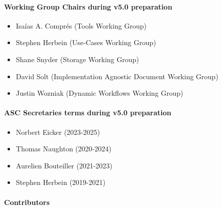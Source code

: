 \paragraph*{Working Group Chairs during v5.0 preparation}

\begin{itemize}
    \item Isaías A. Comprés (Tools Working Group)
    \item Stephen Herbein (Use-Cases Working Group)
    \item Shane Snyder (Storage Working Group)
    \item David Solt (Implementation Agnostic Document Working Group)
    \item Justin Wozniak (Dynamic Workflows Working Group)
\end{itemize}

\paragraph*{ASC Secretaries terms during v5.0 preparation}

\begin{itemize}
    \item Norbert Eicker (2023-2025)
    \item Thomas Naughton (2020-2024)
    \item Aurelien Bouteiller (2021-2023)
    \item Stephen Herbein (2019-2021)
\end{itemize}

\paragraph*{Contributors}


